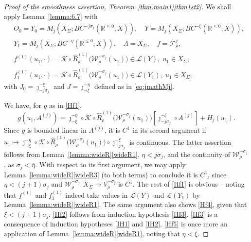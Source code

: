 \documentclass[a4paper, 12pt, oneside, reqno, notitlepage]{amsart}
\theoremstyle{plain}
\theoremstyle{definition}
\theoremstyle{remark}
\begin{document}
\begin{proof}[Proof of the smoothness assertion, Theorem~\ref{thm:main1}\ref{thm1st2}]
We shall apply Lemma~\ref{lemma:6.7} with
\begin{align*}
    &O_0 = Y_0 = M_j(X_\Sigma;BC^{-j \sigma_j}(\mathbb{R}^{\leq 0};X)), \quad Y = M_j(X_\Sigma;BC^{-\xi}(\mathbb{R}^{\leq 0};X)), \\  
    &Y_1 = M_j(X_\Sigma;BC^{-\eta}(\mathbb{R}^{\leq 0};X)), \quad
    \Lambda  = X_\Sigma, \quad f = \mathcal{F}_\rho^{j}, \\ 
    &f^{(1)}(u_1,\cdot) =  \mathcal{K} \circ \widehat{R}_\rho^{(1)} \big(\mathcal{W}_\rho^{- \sigma_j}(u_1) \big) \in \mathcal{L}(Y), \; u_1 \in X_\Sigma, \\
    & f^{(1)}_1(u_1,\cdot) =  \mathcal{K} \circ \widehat{R}_\rho^{(1)} \big(\mathcal{W}_\rho^{- \sigma_j}(u_1) \big) \in \mathcal{L}(Y_1), \; u_1 \in X_\Sigma,
\end{align*}
with $J_0 = \jmath_{-j \sigma_j}^{-\xi}$ and $J = \jmath_{-\xi}^{-\eta}$ defined as in \eqref{eq:jmathMj}.

We have, for $g$ as in \ref{Hf1},
\begin{displaymath}
    g(u_1,A^{(j)}) =\jmath_{-\xi}^{-\eta} \circ \mathcal{K} \circ \widehat{R}_\rho^{(1)} \big(\mathcal{W}_\rho^{- \sigma_j}(u_1) \big) [\jmath_{-j \sigma_j}^{-\xi} \circ  A^{(j)}] + H_j(u_1).
\end{displaymath}
Since $g$ is bounded linear in $A^{(j)}$, it is $C^1$ in its second argument if $u_1 \mapsto \jmath_{-\xi}^{-\eta} \circ \mathcal{K} \circ \widehat{R}_\rho^{(1)} \big(\mathcal{W}_\rho^{-\sigma_j}(u_1) \big) \circ \jmath_{-j \sigma_j}^{-\xi} $ is continuous.
The latter assertion follows from Lemma~\ref{lemma:wideR}\ref{wideR1}, $\eta <j\sigma_j$, and the continuity of $\mathcal{W}_\rho^{- \sigma_j}$, as $\sigma_j < \overline{\eta}$. 
With respect to its first argument, we may apply Lemma~\ref{lemma:wideR}\ref{wideR3} (to both terms) to conclude it is $C^1$, since $\eta <   (j+1)\sigma_j$ and $\mathcal{W}_\rho^{-\sigma_j}:X_\Sigma \to V_\rho^{-\sigma_j}$ is $C^1$.
The rest of \ref{Hf1} is obvious -- noting that $f^{(1)}$ and $f^{(1)}_1$ indeed take values in $\mathcal{L}(Y)$ and $\mathcal{L}(Y_1)$ by Lemma~\ref{lemma:wideR}\ref{wideR1}.
The same argument also shows \ref{Hf4}, given that $\xi < (j+1) \sigma_j$.
\ref{Hf2} follows from induction hypothesis \ref{IH3}.
\ref{Hf3} is a consequence of induction hypotheses \ref{IH1} and \ref{IH2}.
\ref{Hf5} is once more an application of Lemma~\ref{lemma:wideR}\ref{wideR1}, noting that $\eta < \xi$.


\end{proof}
\end{document}
